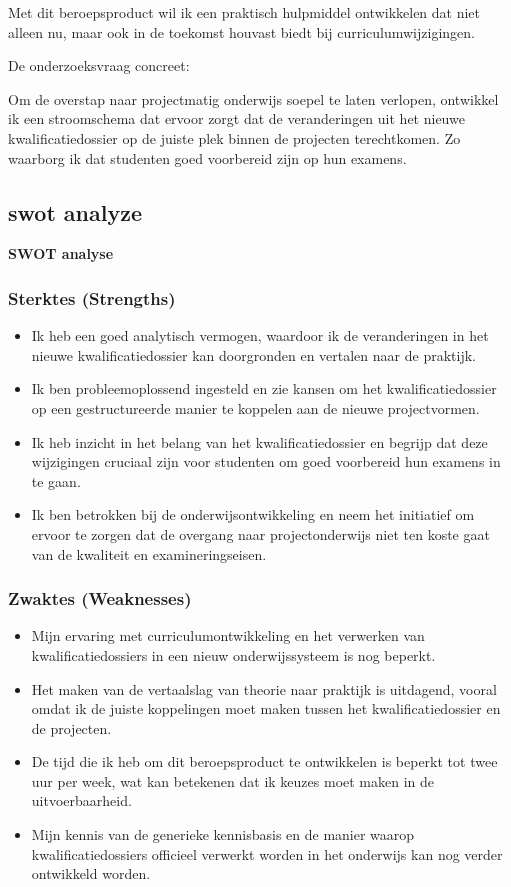 Met dit beroepsproduct wil ik een praktisch hulpmiddel ontwikkelen dat niet alleen nu, maar ook in de toekomst houvast biedt bij curriculumwijzigingen.

 
De onderzoeksvraag concreet:
\begin{displayquote}    
    Om de overstap naar projectmatig onderwijs soepel te laten verlopen, ontwikkel ik een stroomschema dat ervoor zorgt dat de veranderingen uit het nieuwe kwalificatiedossier op de juiste plek binnen de projecten terechtkomen. Zo waarborg ik dat studenten goed voorbereid zijn op hun examens. 
\end{displayquote}


\subsection{swot analyze}

\textbf{SWOT analyse}

\subsubsection{Sterktes (Strengths)}
\begin{itemize}
    \item Ik heb een goed analytisch vermogen, waardoor ik de veranderingen in het nieuwe kwalificatiedossier kan doorgronden en vertalen naar de praktijk.
    \item Ik ben probleemoplossend ingesteld en zie kansen om het kwalificatiedossier op een gestructureerde manier te koppelen aan de nieuwe projectvormen.
    \item Ik heb inzicht in het belang van het kwalificatiedossier en begrijp dat deze wijzigingen cruciaal zijn voor studenten om goed voorbereid hun examens in te gaan.
    \item Ik ben betrokken bij de onderwijsontwikkeling en neem het initiatief om ervoor te zorgen dat de overgang naar projectonderwijs niet ten koste gaat van de kwaliteit en examineringseisen.
\end{itemize}

\subsubsection{Zwaktes (Weaknesses)}
\begin{itemize}
    \item  Mijn ervaring met curriculumontwikkeling en het verwerken van kwalificatiedossiers in een nieuw onderwijssysteem is nog beperkt.
    \item Het maken van de vertaalslag van theorie naar praktijk is uitdagend, vooral omdat ik de juiste koppelingen moet maken tussen het kwalificatiedossier en de projecten.
    \item De tijd die ik heb om dit beroepsproduct te ontwikkelen is beperkt tot twee uur per week, wat kan betekenen dat ik keuzes moet maken in de uitvoerbaarheid.
    \item Mijn kennis van de generieke kennisbasis en de manier waarop kwalificatiedossiers officieel verwerkt worden in het onderwijs kan nog verder ontwikkeld worden.
\end{itemize}


